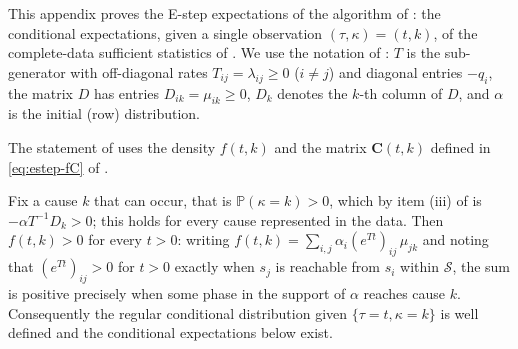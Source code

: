 \documentclass{article}
\newcommand{\Prob}{\mathbb{P}}
\newcommand{\cs}{\mathcal{S}}
\newcommand{\subchg}[1]{#1}
\begin{document}
This appendix proves the E-step expectations of the algorithm of : the conditional expectations, given a single observation $(\tau,\kappa)=(t,k)$, of the complete-data sufficient statistics of . We use the notation of : $T$ is the sub-generator with off-diagonal rates $T_{ij}=\lambda_{ij}\ge0$ ($i\neq j$) and diagonal entries $-q_i$, the matrix $D$ has entries $D_{ik}=\mu_{ik}\ge0$, $D_k$ denotes the $k$-th column of $D$, and $\alpha$ is the initial (row) distribution.

The statement of  uses the density $f(t,k)$ and the matrix $\mathbf C(t,k)$ defined in \eqref{eq:estep-fC} of .

\subchg{Fix a cause $k$ that can occur, that is $\Prob(\kappa=k)>0$, which by item (iii) of \Cref{prop:maph-props} is $-\alpha T^{-1}D_k>0$; this holds for every cause represented in the data. Then $f(t,k)>0$ for every $t>0$: writing $f(t,k)=\sum_{i,j}\alpha_i (e^{Tt})_{ij}\,\mu_{jk}$ and noting that $(e^{Tt})_{ij}>0$ for $t>0$ exactly when $s_j$ is reachable from $s_i$ within $\cs$, the sum is positive precisely when some phase in the support of $\alpha$ reaches cause $k$. Consequently} the regular conditional distribution given $\{\tau=t,\kappa=k\}$ is well defined and the conditional expectations below exist.
\end{document}

